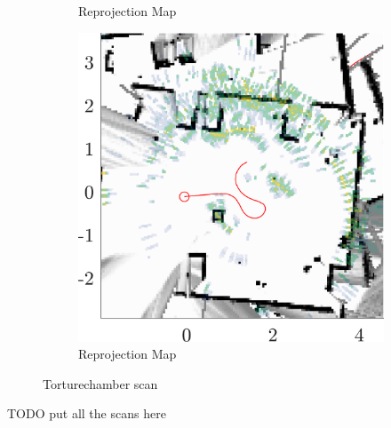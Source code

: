 \begin{figure}[htbp]
\begin{subfigure}[t]{0.475\textwidth}
        \caption{\small Reprojection Map}
    \end{subfigure}%
    \hfill%
    \begin{subfigure}[t]{0.475\textwidth}   
        \centering 
        \includegraphics[max width=\linewidth, max height=\linewidth]{gfx/results/torturechamber_map.png}
        \caption{\small Reprojection Map}
    \end{subfigure}%
    \caption{Torturechamber scan}
\end{figure}

TODO put all the scans here

